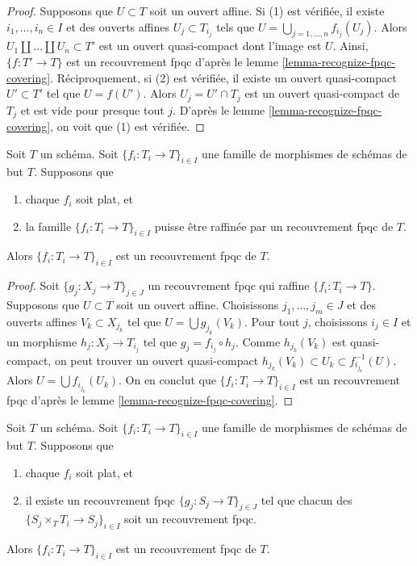 \begin{proof}
Supposons que $U \subset T$ soit un ouvert affine. Si (1) est vérifiée, il existe
$i_1, \ldots, i_n \in I$ et des ouverts affines $U_j \subset T_{i_j}$ tels que
$U = \bigcup_{j = 1, \ldots, n} f_{i_j}(U_j)$. Alors
$U_1 \amalg \ldots \amalg U_n \subset T'$ est un ouvert quasi-compact dont l'image
est $U$. Ainsi, $\{f : T' \to T\}$ est un recouvrement fpqc d'après le
lemme \ref{lemma-recognize-fpqc-covering}.
Réciproquement, si (2) est vérifiée, il existe un ouvert quasi-compact
$U' \subset T'$ tel que $U = f(U')$. Alors $U_j = U' \cap T_j$ est un ouvert quasi-compact
de $T_j$ et est vide pour presque tout $j$. D'après le
lemme \ref{lemma-recognize-fpqc-covering}, on voit que (1) est vérifiée.
\end{proof}

\begin{lemma}
\label{lemma-family-flat-dominated-covering}
Soit $T$ un schéma. Soit $\{f_i : T_i \to T\}_{i \in I}$ une famille de
morphismes de schémas de but $T$. Supposons que
\begin{enumerate}
\item chaque $f_i$ soit plat, et
\item la famille $\{f_i : T_i \to T\}_{i \in I}$ puisse être raffinée par un
recouvrement fpqc de $T$.
\end{enumerate}
Alors $\{f_i : T_i \to T\}_{i \in I}$ est un recouvrement fpqc de $T$.
\end{lemma}

\begin{proof}
Soit $\{g_j : X_j \to T\}_{j \in J}$ un recouvrement fpqc qui raffine
$\{f_i : T_i \to T\}$. Supposons que $U \subset T$ soit un ouvert affine.
Choisissons $j_1, \ldots, j_m \in J$ et des ouverts affines $V_k \subset X_{j_k}$
tel que $U = \bigcup g_{j_k}(V_k)$. Pour tout $j$, choisissons $i_j \in I$
et un morphisme $h_j : X_j \to T_{i_j}$ tel que $g_j = f_{i_j} \circ h_j$.
Comme $h_{j_k}(V_k)$ est quasi-compact, on peut trouver un ouvert quasi-compact
$h_{j_k}(V_k) \subset U_k \subset f_{i_{j_k}}^{-1}(U)$.
Alors $U = \bigcup f_{i_{j_k}}(U_k)$. On en conclut que
$\{f_i : T_i \to T\}_{i \in I}$ est un recouvrement fpqc d'après le
lemme \ref{lemma-recognize-fpqc-covering}.
\end{proof}

\begin{lemma}
\label{lemma-family-flat-fpqc-local-covering}
Soit $T$ un schéma. Soit $\{f_i : T_i \to T\}_{i \in I}$ une famille de
morphismes de schémas de but $T$. Supposons que
\begin{enumerate}
\item chaque $f_i$ soit plat, et
\item il existe un recouvrement fpqc
$\{g_j : S_j \to T\}_{j \in J}$ tel que chacun des
$\{S_j \times_T T_i \to S_j\}_{i \in I}$ soit un recouvrement fpqc.
\end{enumerate}
Alors $\{f_i : T_i \to T\}_{i \in I}$ est un recouvrement fpqc de $T$.
\end{lemma}

